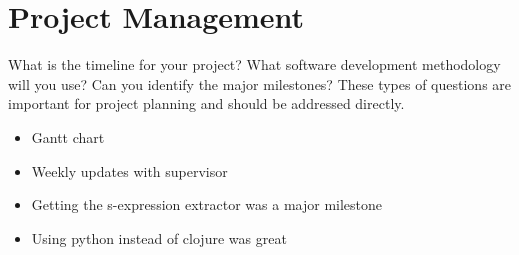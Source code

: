 
\chapter{Project Management}

What is the timeline for your project? What software development
methodology will you use? Can you identify the major milestones? These types of questions are
important for project planning and should be addressed directly.

\begin{itemize}
\item Gantt chart 
\item Weekly updates with supervisor 
\item Getting the s-expression extractor was a major milestone 
\item Using python instead of clojure was great 
\end{itemize}
